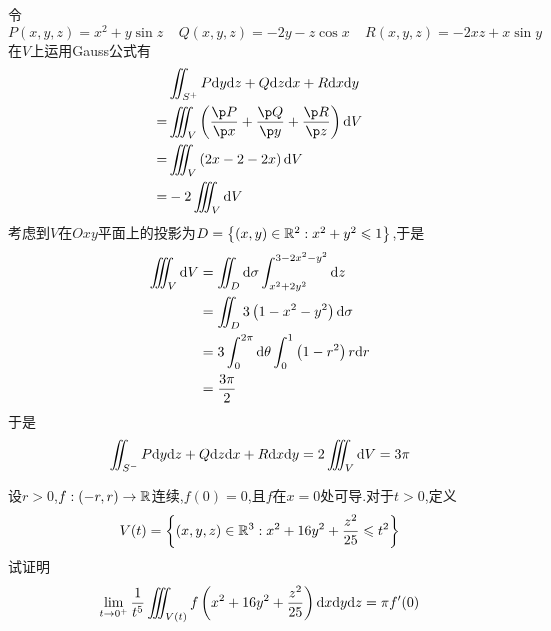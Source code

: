 \documentclass{ctexart}
\begin{document}
\begin{solution}
    令
    \[P(x,y,z)=x^2+y\sin z\ \ \ \ \ Q(x,y,z)=-2y-z\cos x\ \ \ \ \ R(x,y,z)=-2xz+x\sin y\]
    在$V$上运用Gauss公式有
    \[\begin{aligned}
        &\iint_{S^+}P\di y\di z+Q\di z\di x+R\di x\di y\\
        =&\iiint_V\left(\dfrac{\p P}{\p x}+\dfrac{\p Q}{\p y}+\dfrac{\p R}{\p z}\right)\di V \\
        =&\iiint_V\left(2x-2-2x\right)\di V \\
        =&-2\iiint_V\di V
    \end{aligned}\]
    考虑到$V$在$Oxy$平面上的投影为$D=\left\{(x,y)\in\mathbb{R}^2:x^2+y^2\leqslant1\right\}$,于是
    \[\begin{aligned}
        \iiint_V\mathrm{d} V
        &= \iint_D\mathrm{d}\sigma\int_{x^2+2y^2}^{3-2x^2-y^2}\mathrm{d} z \\
        &= \iint_D3\left(1-x^2-y^2\right)\mathrm{d}\sigma \\
        &= 3\int_0^{2\pi}\mathrm{d}\theta\int_0^1\left(1-r^2\right)r\mathrm{d} r \\
        &= \dfrac{3\pi}{2}
    \end{aligned}\]
    于是
    \[\iint_{S^-}P\mathrm{d} y\mathrm{d} z+Q\mathrm{d} z\mathrm{d} x+R\mathrm{d} x\mathrm{d} y=2\iiint_{V}\mathrm{d} V=3\pi\]

\end{solution}
\begin{problem}[8.(15\songti{分})]
    设$r>0$,$f:(-r,r)\to\mathbb{R}$连续,$f(0)=0$,且$f$在$x=0$处可导.对于$t>0$,定义
    \[V(t)=\left\{(x,y,z)\in\mathbb{R}^3:x^2+16y^2+\dfrac{z^2}{25}\leqslant t^2\right\}\]
    试证明
    \[\lim_{t\to0^+}\dfrac{1}{t^5}\iiint_{V(t)}f\left(x^2+16y^2+\dfrac{z^2}{25}\right)\mathrm{d} x\mathrm{d} y\mathrm{d} z=\pi f'(0)\]

\end{problem}
\end{document}
